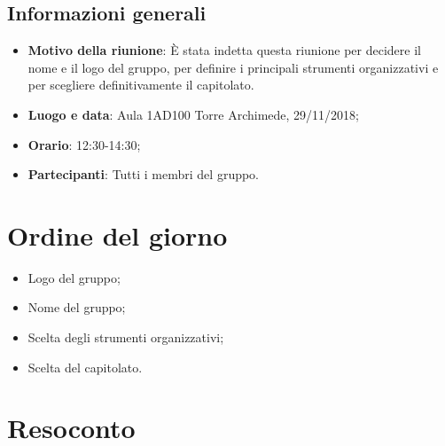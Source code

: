 \documentclass[12pt]{article}
\begin{document}
    \subsection{Informazioni generali}
    \begin{itemize}
        \item \textbf{Motivo della riunione}: È stata indetta questa riunione per decidere il nome e il logo del gruppo, per definire i principali strumenti organizzativi e per scegliere definitivamente il capitolato.
        \item \textbf{Luogo e data}: Aula 1AD100 Torre Archimede, 29/11/2018;
        \item \textbf{Orario}: 12:30-14:30;
        \item \textbf{Partecipanti}: Tutti i membri del gruppo.

    \end{itemize}
        \newpage
\section{Ordine del giorno}
    \begin{itemize}
        \item Logo del gruppo;
        \item Nome del gruppo;
        \item Scelta degli strumenti organizzativi;
        \item Scelta del capitolato.

    \end{itemize}
    
\newpage
\section{Resoconto}
\end{document}
